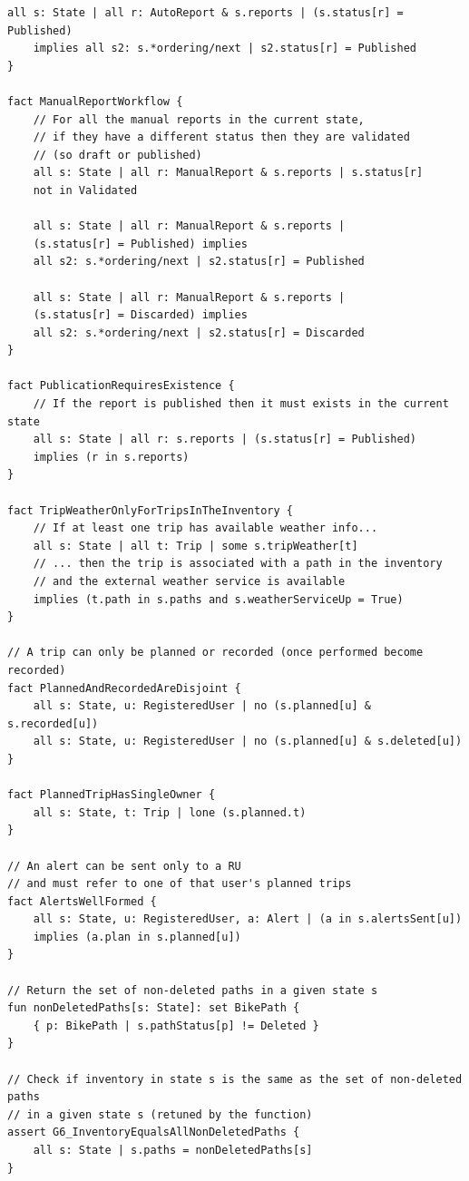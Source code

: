 \begin{lstlisting}[caption=Complete Alloy Formalization.]
    all s: State | all r: AutoReport & s.reports | (s.status[r] = Published) 
    implies all s2: s.*ordering/next | s2.status[r] = Published
}

fact ManualReportWorkflow {
    // For all the manual reports in the current state, 
    // if they have a different status then they are validated 
    // (so draft or published)
    all s: State | all r: ManualReport & s.reports | s.status[r] 
    not in Validated				

    all s: State | all r: ManualReport & s.reports | 
    (s.status[r] = Published) implies 
    all s2: s.*ordering/next | s2.status[r] = Published

    all s: State | all r: ManualReport & s.reports | 
    (s.status[r] = Discarded) implies 
    all s2: s.*ordering/next | s2.status[r] = Discarded
}

fact PublicationRequiresExistence {
    // If the report is published then it must exists in the current state
    all s: State | all r: s.reports | (s.status[r] = Published) 
    implies (r in s.reports)	
}

fact TripWeatherOnlyForTripsInTheInventory {
    // If at least one trip has available weather info...
    all s: State | all t: Trip | some s.tripWeather[t] 
    // ... then the trip is associated with a path in the inventory 
    // and the external weather service is available
    implies	(t.path in s.paths and s.weatherServiceUp = True)	
}

// A trip can only be planned or recorded (once performed become recorded)
fact PlannedAndRecordedAreDisjoint {
    all s: State, u: RegisteredUser | no (s.planned[u] & s.recorded[u])
    all s: State, u: RegisteredUser | no (s.planned[u] & s.deleted[u])
}

fact PlannedTripHasSingleOwner {
    all s: State, t: Trip | lone (s.planned.t)		
}

// An alert can be sent only to a RU 
// and must refer to one of that user's planned trips
fact AlertsWellFormed {
    all s: State, u: RegisteredUser, a: Alert | (a in s.alertsSent[u]) 
    implies (a.plan in s.planned[u])
}

// Return the set of non-deleted paths in a given state s
fun nonDeletedPaths[s: State]: set BikePath {
    { p: BikePath | s.pathStatus[p] != Deleted }
}

// Check if inventory in state s is the same as the set of non-deleted paths 
// in a given state s (retuned by the function)
assert G6_InventoryEqualsAllNonDeletedPaths {
    all s: State | s.paths = nonDeletedPaths[s]
}


\end{lstlisting}
